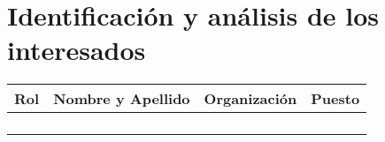 \section{Identificación y análisis de los interesados}
\label{sec:interesados}

\begin{table}[ht]
\begin{tabularx}{\linewidth}{@{}|l|X|X|l|@{}}
\hline
\rowcolor[HTML]{C0C0C0} 
Rol           &Nombre y Apellido &Organización                &Puesto                  	\\ \hline
& & & \\ \hline
& & & \\ \hline
& & & \\ \hline
& & & \\ \hline
\end{tabularx}
\end{table}
